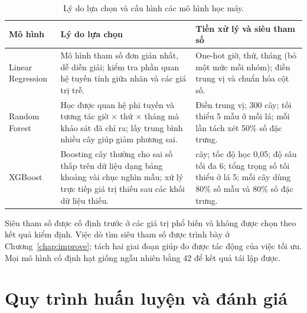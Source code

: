 \begin{table}[htbp]
    \centering
    \caption{Lý do lựa chọn và cấu hình các mô hình học máy.}
    \label{tab:algorithms}
    \small
    \begin{tabularx}{\textwidth}{|>{\raggedright\arraybackslash}p{2.5cm}|>{\raggedright\arraybackslash}X|>{\raggedright\arraybackslash}p{4.6cm}|}
        \hline
        \textbf{Mô hình} & \textbf{Lý do lựa chọn} & \textbf{Tiền xử lý và siêu tham số} \\ \hline
        Linear Regression & Mô hình tham số đơn giản nhất, dễ diễn giải; kiểm tra phần quan hệ tuyến tính giữa nhãn và các giá trị trễ. & One-hot giờ, thứ, tháng (bỏ một mức mỗi nhóm); điền trung vị và chuẩn hóa cột số. \\ \hline
        Random Forest & Học được quan hệ phi tuyến và tương tác giờ $\times$ thứ $\times$ tháng mà khảo sát đã chỉ ra; lấy trung bình nhiều cây giúp giảm phương sai. & Điền trung vị; 300 cây; tối thiểu 5 mẫu ở mỗi lá; mỗi lần tách xét 50\% số đặc trưng. \\ \hline
        XGBoost & Boosting cây thường cho sai số thấp trên dữ liệu dạng bảng khoảng vài chục nghìn mẫu; xử lý trực tiếp giá trị thiếu sau các khối dữ liệu thiếu. & 400 cây; tốc độ học 0,05; độ sâu tối đa 6; tổng trọng số tối thiểu ở lá 5; mỗi cây dùng 80\% số mẫu và 80\% số đặc trưng. \\ \hline
    \end{tabularx}
\end{table}

Siêu tham số được cố định trước ở các giá trị phổ biến và không được chọn theo kết quả kiểm định. Việc dò tìm siêu tham số được trình bày ở Chương~\ref{chap:improve}; tách hai giai đoạn giúp đo được tác động của việc tối ưu. Mọi mô hình cố định hạt giống ngẫu nhiên bằng 42 để kết quả tái lập được.

\section{Quy trình huấn luyện và đánh giá}
\label{sec:protocol}

